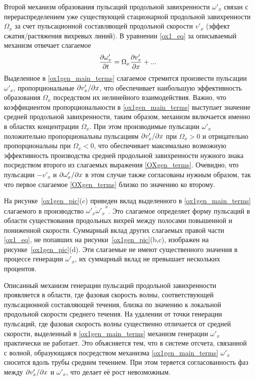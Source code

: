 Второй механизм образования пульсаций продольной завихренности $\omega'_x$ связан с перераспределением уже существующей стационарной продольной завихренности $\Omega_x$ за счет пульсационной составляющей продольной скорости $v'_x$ (эффект сжатия/растяжения вихревых линий). В уравнении \eqref{ox1_eq} за описываемый механизм отвечает слагаемое
\begin{equation}\label{ox1gen_main_terms}
\frac{\partial \omega'_x}{\partial t} = \Omega_x \frac {\partial v'_x}{\partial x} + ...
\end{equation}
Выделенное в \eqref{ox1gen_main_terms} слагаемое стремится произвести пульсации $\omega'_x$, пропорциональные $\partial v'_x / \partial x$, что обеспечивает наибольшую эффективность образования $\Omega_x$ посредством их нелинейного взаимодействия. Важно, что коэффициентом пропорциональности в \eqref{ox1gen_main_terms} выступает значение средней продольной завихренности, таким образом, механизм включается именно в областях концентрации $\Omega_x$. При этом производимые пульсации $\omega'_x$ положительно пропорциональны пульсациям  $\partial v'_x / \partial x$ при $\Omega_x>0$ и отрицательно пропорциональны при $\Omega_x<0$, что обеспечивает максимально возможную эффективность производства средней продольной завихренности нужного знака посредством второго из слагаемых выражения \eqref{OXgen_terms}. Очевидно, что пульсации $-v'_x$ и $\partial \omega'_x / \partial x$ в этом случае также согласованы нужным образом, так что первое слагаемое \eqref{OXgen_terms} близко по значению ко второму.

На рисунке~\ref{ox1gen_pic}(c) приведен вклад выделенного в \eqref{ox1gen_main_terms} слагаемого в производство $\overline{\omega'_x \omega'_x}^x$. Это слагаемое определяет форму пульсаций в области существования продольных вихрей между полосами повышенной и пониженной скорости. Суммарный вклад других слагаемых правой части \eqref{ox1_eq}, не попавших на рисунки~\ref{ox1gen_pic}(b,c), изображен на рисунке~\ref{ox1gen_pic}(d). Эти слагаемые не имеют существенного значения в процессе генерации $\omega'_x$, их суммарный вклад не превышает нескольких процентов. 

Описанный механизм генерации пульсаций продольной завихренности проявляется в области, где фазовая скорость волны, соответствующей пульсационной составляющей течения, близка по значению к локальной продольной скорости среднего течения. На удалении от точки генерации пульсаций, где фазовая скорость волны существенно отличается от средней скорости, выделенный в \eqref{ox1gen_main_terms} механизм генерации $\omega'_x$ практически не работает. Это объясняется тем, что в системе отсчета, связанной с волной, образующаяся посредством механизма \eqref{ox1gen_main_terms} $\omega'_x$ сносится вдоль трубы средним течением. При этом теряется согласованность фаз между $\partial v'_x / \partial x$ и $\omega'_x$, что делает её рост невозможным. 

